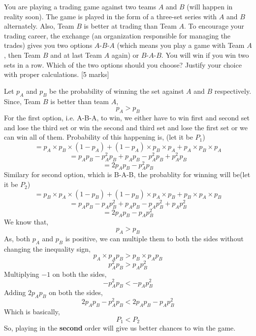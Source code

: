 
\begin{que}
	You are playing a trading game against two teams $A$ and $B$ (will happen
	in reality soon). The game is played in the form of a three-set series
	with $A$ and $B$ alternately. Also, Team $B$ is better at trading than Team
	$A$. To encourage your trading career, the exchange (an organization
	responsible for managing the trades) gives you two options $A$-$B$-$A$ (which
	means you play a game with Team $A$, then Team $B$ and at last Team $A$
	again) or $B$-$A$-$B$. You will win if you win two sets in a row. Which of
	the two options should you choose? Justify your choice with proper
	calculations.
	\hspace*{\fill} [5 marks]
\end{que}

\begin{tcolorbox}[breakable]
	\begin{sol}
		Let $p_A$ and $p_B$ be the probability of winning the set against $A$ and $B$ respectively. Since, Team $B$ is better than team $A$,
        \[p_A>p_B\]
        For the first option, i.e. A-B-A, to win, we either have to win first and second set and lose the third set or win the second and third set and lose the first set or we can win all of them. Probability of this happening is, (let it be $P_1$)
        \[=p_A\times p_B \times (1-p_A)+(1-p_A)\times p_B\times p_A +p_A\times p_B\times p_A\]
        \[=p_Ap_B-p_A^2p_B+p_Ap_B-p_A^2p_B+p_A^2p_B\]
        \[=2p_Ap_B-p_A^2p_B\]
        Similary for second option, which is B-A-B, the probablity for winning will be(let it be $P_2$)
        \[=p_B\times p_A \times (1-p_B)+(1-p_B)\times p_A\times p_B +p_B\times p_A\times p_B\]
        \[=p_Ap_B-p_Ap_B^2+p_Ap_B-p_Ap_B^2+p_Ap_B^2\]
        \[=2p_Ap_B-p_Ap_B^2\]
        We know that,
        \[p_A>p_B\]
        As, both $p_A$ and $p_B$ is positive, we can multiple them to both the sides without changing the inequality sign,
        \[p_A\times p_Ap_B > p_B\times p_Ap_B\]
        \[p_A^2p_B > p_Ap_B^2\]
        Multiplying $-1$ on both the sides,
        \[-p_A^2p_B < -p_Ap_B^2\]
        Adding $2p_Ap_B$ on both the sides,
        \[ 2p_Ap_B-p_A^2p_B < 2p_Ap_B-p_Ap_B^2\]
        Which is basically,
        \[P_1 < P_2\]
        So, playing in the \textbf{second} order will give us better chances to win the game.
	\end{sol}
\end{tcolorbox}
